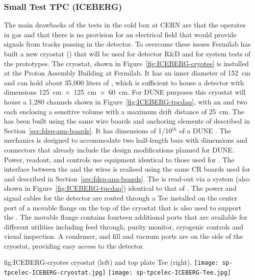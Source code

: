\subsubsection{Small Test TPC (ICEBERG)}
\label{sec:fdsp-tpcelec-qa-facilities-testtpc}

The main drawbacks of the tests in the cold box at CERN are that the 
operates in gas and that there is no provision for an electrical field that 
would provide signals from tracks passing in the detector. To overcome these 
issues Fermilab has built a new cryostat () that will be used for 
 detector R\&D and for system tests of the  prototypes. 
The  cryostat, shown in Figure~\ref{fig:ICEBERG-cryotee} is installed
at the Proton Assembly Building at Fermilab. It has an inner diameter of 152~cm
and can hold about 35,000 liters of , which is sufficient to house a
detector with dimensions 125~cm~$\times$~125~cm~$\times$~60~cm. For DUNE 
purposes this cryostat will house a 1,280 channels  shown in
Figure~\ref{fig:ICEBERG-tpcdaq}, with an  and two  each 
enclosing a sensitive volume with a maximum drift distance of 25~cm. The  
has been built using the same wire boards and anchoring elements of   
described in Section~\ref{sec:fdsp-apa-boards}. It has dimensions of 
1/10$^{th}$ of a DUNE . The  mechanics is designed to accommodate 
two half-length  bars with dimensions and connectors that already 
include the design modifications planned for DUNE. Power, readout, and controls 
use equipment identical to those used for . The interface between the 
 and the  wires is realised using the same CR boards used 
for  and described in Section~\ref{sec:fdsp-apa-boards}. The  is
read-out via a  system (also shown in Figure~\ref{fig:ICEBERG-tpcdaq})
identical to that of . The power and signal cables for the detector 
are routed through a Tee installed on the center port of a movable flange on the 
top of the cryostat that is also used to support the . The movable 
flange contains fourteen additional ports that are available for different utilities 
including  feed through, purity monitor, cryogenic controls and visual inspection. 
A condenser, and  fill and vacuum ports are on the side of the cryostat, 
providing easy access to the detector.

\begin{dunefigure}
  {fig:ICEBERG-cryotee}
	{ cryostat (left) and top plate Tee (right).}
  \texttt{[image: sp-tpcelec-ICEBERG-cryostat.jpg]}
  \texttt{[image: sp-tpcelec-ICEBERG-Tee.jpg]}
\end{dunefigure}

